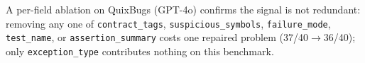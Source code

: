 A per-field ablation on QuixBugs (GPT-4o) confirms the signal is not
redundant: removing any one of \texttt{contract\_tags},
\texttt{suspicious\_symbols}, \texttt{failure\_mode}, \texttt{test\_name}, or
\texttt{assertion\_summary} costs one repaired problem (37/40${\to}$36/40);
only \texttt{exception\_type} contributes nothing on this benchmark.
